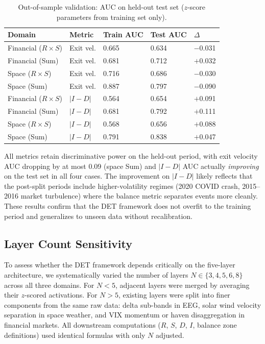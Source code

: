 \documentclass[12pt,a4paper]{article}
\begin{document}
\begin{table}[H]
\caption{Out-of-sample validation: AUC on held-out test set ($z$-score parameters from training set only).\label{tab:oos}}
\begin{tabular}{@{}lllll@{}}
\toprule
Domain & Metric & Train AUC & Test AUC & $\Delta$ \\
\midrule
Financial ($R \times S$) & Exit vel. & 0.665 & 0.634 & $-$0.031 \\
Financial (Sum) & Exit vel. & 0.681 & 0.712 & $+$0.032 \\
Space ($R \times S$) & Exit vel. & 0.716 & 0.686 & $-$0.030 \\
Space (Sum) & Exit vel. & 0.887 & 0.797 & $-$0.090 \\
Financial ($R \times S$) & $|I{-}D|$ & 0.564 & 0.654 & $+$0.091 \\
Financial (Sum) & $|I{-}D|$ & 0.681 & 0.792 & $+$0.111 \\
Space ($R \times S$) & $|I{-}D|$ & 0.568 & 0.656 & $+$0.088 \\
Space (Sum) & $|I{-}D|$ & 0.791 & 0.838 & $+$0.047 \\
\bottomrule
\end{tabular}
\end{table}

All metrics retain discriminative power on the held-out period, with exit velocity AUC dropping by at most 0.09 (space Sum) and $|I{-}D|$ AUC actually \emph{improving} on the test set in all four cases. The improvement on $|I{-}D|$ likely reflects that the post-split periods include higher-volatility regimes (2020 COVID crash, 2015--2016 market turbulence) where the balance metric separates events more cleanly. These results confirm that the DET framework does not overfit to the training period and generalizes to unseen data without recalibration.

\subsection{Layer Count Sensitivity}

To assess whether the DET framework depends critically on the five-layer architecture, we systematically varied the number of layers $N \in \{3, 4, 5, 6, 8\}$ across all three domains. For $N < 5$, adjacent layers were merged by averaging their $z$-scored activations. For $N > 5$, existing layers were split into finer components from the same raw data: delta sub-bands in EEG, solar wind velocity separation in space weather, and VIX momentum or haven disaggregation in financial markets. All downstream computations ($R$, $S$, $D$, $I$, balance zone definitions) used identical formulas with only $N$ adjusted.
\end{document}
